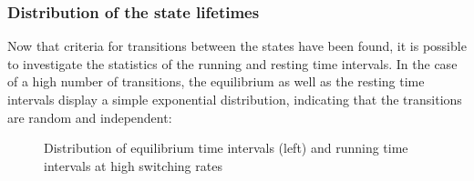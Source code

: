 \documentclass[12pt,a4paper]{article}
\begin{document}
\subsubsection{Distribution of the state lifetimes}
Now that criteria for transitions between the states have been found, it is possible to investigate the statistics of the running and resting time intervals. In the case of a high number of transitions, the equilibrium as well as the resting time intervals display a simple exponential distribution, indicating that the transitions are random and independent:
\begin{figure}[H]
	\hspace*{-0.5cm}
	\caption{Distribution of equilibrium time intervals (left) and running time intervals at high switching rates}
	\label{intdistgood}
\end{figure}
\end{document}
